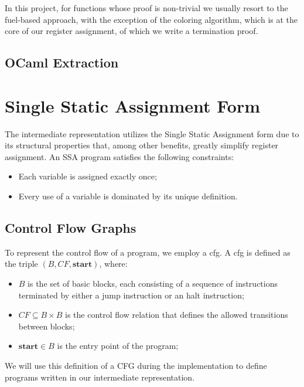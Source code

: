 In this project, for functions whose proof is non-trivial we usually resort to the fuel-based approach, with the exception of the coloring algorithm, which is at the core of our register assignment, of which we write a termination proof.

\subsection{OCaml Extraction}
\label{subsec:extract}

\section{Single Static Assignment Form}
\label{sec:ssa}

The intermediate representation utilizes the Single Static Assignment form due to its structural properties that, among other benefits, greatly simplify register assignment. An SSA program satisfies the following constraints:

\begin{itemize}
    \item Each variable is assigned exactly once;
    \item Every use of a variable is dominated by its unique definition.
\end{itemize}

\subsection{Control Flow Graphs}
\label{subsec:cfg}

To represent the control flow of a program, we employ a \gls{cfg}. A \gls{cfg} is defined as the triple $(B, CF, \textbf{start})$, where:

\begin{itemize}
    \item $B$ is the set of basic blocks, each consisting of a sequence of instructions terminated by either a jump instruction or an halt instruction;
    \item $CF \subseteq B \times B$ is the control flow relation that defines the allowed transitions between blocks;
    \item $\textbf{start} \in B$ is the entry point of the program;
\end{itemize}

We will use this definition of a CFG during the implementation to define programs written in our intermediate representation.

